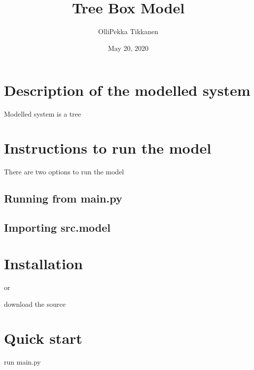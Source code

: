 \documentclass[letterpaper,10pt,english]{sphinxmanual}
\title{Tree Box Model}
\date{May 20, 2020}
\author{Olli\sphinxhyphen{}Pekka Tikkanen}
\begin{document}
\pagestyle{empty}
\sphinxmaketitle
\pagestyle{plain}
\sphinxtableofcontents
\pagestyle{normal}
\label{\detokenize{index::doc}}



\chapter{Description of the modelled system}
\label{\detokenize{modelled_system:description-of-the-modelled-system}}\label{\detokenize{modelled_system::doc}}
Modelled system is a tree


\chapter{Instructions to run the model}
\label{\detokenize{instructions_to_run:instructions-to-run-the-model}}\label{\detokenize{instructions_to_run::doc}}
There are two options to run the model


\section{Running from main.py}
\label{\detokenize{instructions_to_run:running-from-main-py}}

\section{Importing src.model}
\label{\detokenize{instructions_to_run:importing-src-model}}

\chapter{Installation}
\label{\detokenize{index:installation}}
\begin{sphinxVerbatim}[commandchars=\\\{\}]
  
\end{sphinxVerbatim}

or

download the source 


\chapter{Quick start}
\label{\detokenize{index:quick-start}}
run main.py
\end{document}

